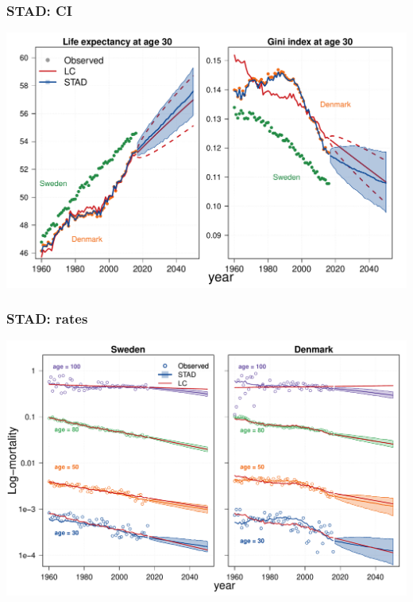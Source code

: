 \documentclass[12pt, xcolor=table]{beamer}  %
\begin{document}
\begin{frame}[noframenumbering]\frametitle{STAD: CI}

\vspace{-0.5cm}

	
	\begin{center}	
		\vspace{0.2cm}
		
		\includegraphics[scale=.42]{Figures/Ch2/F5_2}
		
	\end{center}
	
\end{frame}

\begin{frame}[noframenumbering]\frametitle{STAD: rates}

\vspace{-0.5cm} 
	
	\begin{center}	
		\vspace{0.2cm}
		
		\includegraphics[scale=.42]{Figures/Ch2/F6_2}
		
	\end{center}
	
\end{frame}
\end{document}

